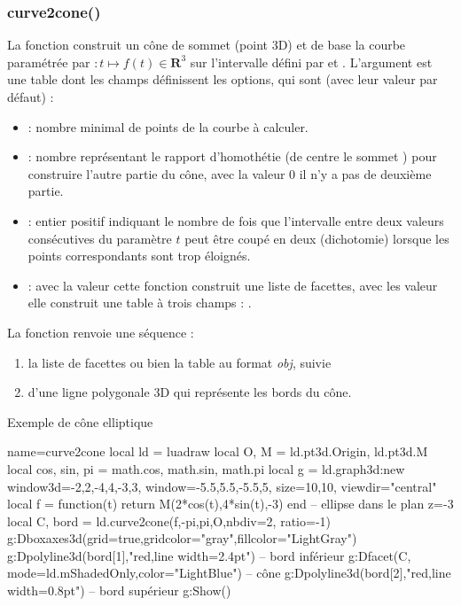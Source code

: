 \subsubsection{curve2cone()}
La fonction  construit un cône de sommet  (point 3D) et de base la courbe paramétrée par $\colon t\mapsto f(t)\in\mathbf R^3$ sur l'intervalle défini par  et . L'argument  est une table dont les champs définissent les options, qui sont (avec leur valeur  par défaut) :
    \begin{itemize}
        \item {} : nombre minimal de points de la courbe à calculer.
        
        \item {} :  nombre représentant le rapport d'homothétie (de centre le sommet ) pour construire l'autre partie du cône, avec la valeur $0$ il n'y a pas de deuxième partie.
        
        \item {} : entier positif indiquant le nombre de fois que l'intervalle entre deux valeurs consécutives du paramètre $t$ peut être coupé en deux (dichotomie) lorsque les points correspondants sont trop éloignés.
        
        \item {} : avec la valeur \false cette fonction construit une liste de facettes, avec les valeur \true elle construit une table à trois champs : .
    \end{itemize}
La fonction renvoie une séquence : 
\begin{enumerate}
    \item la liste de facettes ou bien la table au format \emph{obj}, suivie 
    \item d'une ligne polygonale 3D qui représente les bords du cône.
\end{enumerate}

 
\begin{demo}{Exemple de cône elliptique}
\begin{luadraw}{name=curve2cone}
local ld = luadraw
local O, M = ld.pt3d.Origin, ld.pt3d.M
local cos, sin, pi = math.cos, math.sin, math.pi
local g = ld.graph3d:new{ window3d={-2,2,-4,4,-3,3}, window={-5.5,5.5,-5.5,5},
    size={10,10}, viewdir="central"}
local f = function(t) return M(2*cos(t),4*sin(t),-3) end -- ellipse dans le plan z=-3
local C, bord = ld.curve2cone(f,-pi,pi,O,{nbdiv=2, ratio=-1})
g:Dboxaxes3d({grid=true,gridcolor="gray",fillcolor="LightGray"})
g:Dpolyline3d(bord[1],"red,line width=2.4pt") -- bord inférieur
g:Dfacet(C, {mode=ld.mShadedOnly,color="LightBlue"}) -- cône
g:Dpolyline3d(bord[2],"red,line width=0.8pt") -- bord supérieur
g:Show()
\end{luadraw}
\end{demo}

